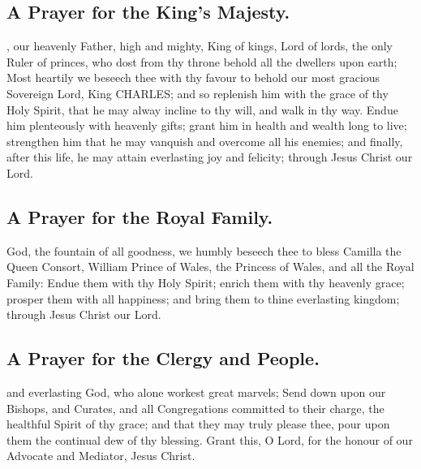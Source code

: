 \subsection{A Prayer for the King's Majesty.}

, our heavenly Father, high and mighty, King of kings, Lord of lords, the only Ruler of princes, who dost from thy throne behold all the dwellers upon earth; Most heartily we beseech thee with thy favour to behold our most gracious Sovereign Lord, King CHARLES; and so replenish him with the grace of thy Holy Spirit, that he may alway incline to thy will, and walk in thy way. Endue him plenteously with heavenly gifts; grant him in health and wealth long to live; strengthen him that he may vanquish and overcome all his enemies; and finally, after this life, he may attain everlasting joy and felicity; through Jesus Christ our Lord.

\subsection{A Prayer for the Royal Family.}

 God, the fountain of all goodness, we humbly beseech thee to bless Camilla the Queen Consort, William Prince of Wales, the Princess of Wales, and all the Royal Family: Endue them with thy Holy Spirit; enrich them with thy heavenly grace; prosper them with all happiness; and bring them to thine everlasting kingdom; through Jesus Christ our Lord.

\subsection{A Prayer for the Clergy and People.}

 and everlasting God, who alone workest great marvels; Send down upon our Bishops, and Curates, and all Congregations committed to their charge, the healthful Spirit of thy grace; and that they may truly please thee, pour upon them the continual dew of thy blessing. Grant this, O Lord, for the honour of our Advocate and Mediator, Jesus Christ.

